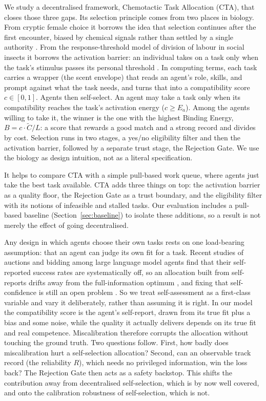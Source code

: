 \documentclass[11pt]{article}
\begin{document}
We study a decentralised framework, Chemotactic Task Allocation (CTA), that closes those three gaps. Its selection principle comes from two places in biology. From cryptic female choice it borrows the idea that selection continues after the first encounter, biased by chemical signals rather than settled by a single authority \citep{fitzpatrick2020cryptic}. From the response-threshold model of division of labour in social insects it borrows the activation barrier: an individual takes on a task only when the task's stimulus passes its personal threshold \citep{bonabeau1996threshold}. In computing terms, each task carries a wrapper (the scent envelope) that reads an agent's role, skills, and prompt against what the task needs, and turns that into a compatibility score $c\in[0,1]$. Agents then self-select. An agent may take a task only when its compatibility reaches the task's activation energy ($c\geq E_a$). Among the agents willing to take it, the winner is the one with the highest Binding Energy, $B=c\cdot\tilde{C}/L$: a score that rewards a good match and a strong record and divides by cost. Selection runs in two stages, a yes/no eligibility filter and then the activation barrier, followed by a separate trust stage, the Rejection Gate. We use the biology as design intuition, not as a literal specification.

It helps to compare CTA with a simple pull-based work queue, where agents just take the best task available. CTA adds three things on top: the activation barrier as a quality floor, the Rejection Gate as a trust boundary, and the eligibility filter with its notions of infeasible and stalled tasks. Our evaluation includes a pull-based baseline (Section~\ref{sec:baseline}) to isolate these additions, so a result is not merely the effect of going decentralised.

Any design in which agents choose their own tasks rests on one load-bearing assumption: that an agent can judge its own fit for a task. Recent studies of auctions and bidding among large language model agents find that their self-reported success rates are systematically off, so an allocation built from self-reports drifts away from the full-information optimum \citep{fradkin2026marketbench}, and fixing that self-confidence is still an open problem \citep{zhang2026confidence}. So we treat self-assessment as a first-class variable and vary it deliberately, rather than assuming it is right. In our model the compatibility score is the agent's self-report, drawn from its true fit plus a bias and some noise, while the quality it actually delivers depends on its true fit and real competence. Miscalibration therefore corrupts the allocation without touching the ground truth. Two questions follow. First, how badly does miscalibration hurt a self-selection allocation? Second, can an observable track record (the reliability $R$), which needs no privileged information, win the loss back? The Rejection Gate then acts as a safety backstop. This shifts the contribution away from decentralised self-selection, which is by now well covered, and onto the calibration robustness of self-selection, which is not.
\end{document}
